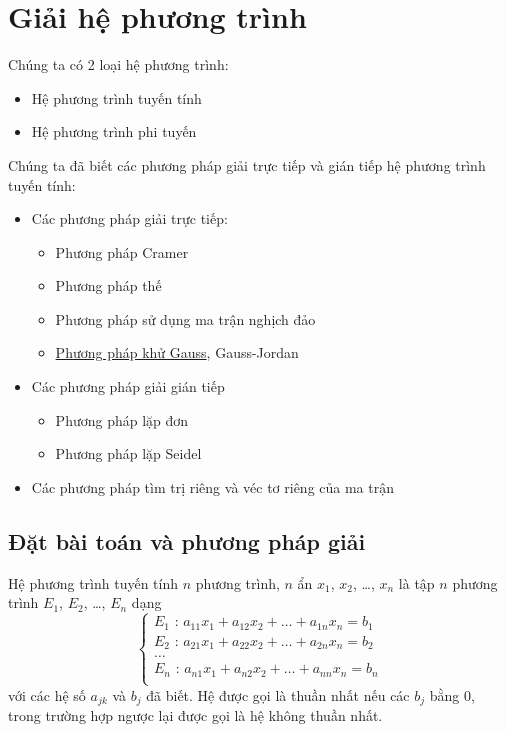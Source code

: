 \documentclass[../../Lectures]{subfiles}
\begin{document}
\chapter{Giải hệ phương trình}

Chúng ta có 2 loại hệ phương trình:
\begin{itemize}
    \item Hệ phương trình tuyến tính
    \item Hệ phương trình phi tuyến
\end{itemize}

Chúng ta đã biết các phương pháp giải trực tiếp và gián tiếp hệ phương trình
tuyến tính:
\begin{itemize}
    \item Các phương pháp giải trực tiếp:
        \begin{itemize}
            \item Phương pháp Cramer
            \item Phương pháp thế
            \item Phương pháp sử dụng ma trận nghịch đảo
            \item \hyperref[method:gauss_elimination]{Phương pháp khử Gauss},
                Gauss-Jordan
        \end{itemize}

    \item Các phương pháp giải gián tiếp
        \begin{itemize}
            \item Phương pháp lặp đơn
            \item Phương pháp lặp Seidel
        \end{itemize}

    \item Các phương pháp tìm trị riêng và véc tơ riêng của ma trận
\end{itemize}



\section{Đặt bài toán và phương pháp giải}

Hệ phương trình tuyến tính \(n\) phương trình, \(n\) ẩn \(x_1\), \(x_2\),
\ldots, \(x_n\) là tập \(n\) phương trình \(E_1\), \(E_2\), \ldots , \(E_n\)
dạng
\[\label{eq:general_system_equations}
    \begin{cases}
        E_1 \text{ : } a_{11} x_1 + a_{12} x_2 + \ldots + a_{1n} x_n = b_1 \\
        E_2 \text{ : } a_{21} x_1 + a_{22} x_2 + \ldots + a_{2n} x_n = b_2 \\
        \ldots \\
        E_n \text{ : } a_{n1} x_1 + a_{n2} x_2 + \ldots + a_{nn} x_n = b_n \\
    \end{cases}
\]
với các hệ số \(a_{jk}\) và \(b_j\) đã biết. Hệ được gọi là thuần nhất nếu các
\(b_j\) bằng \(0\), trong trường hợp ngược lại được gọi là hệ không thuần nhất.
\end{document}
